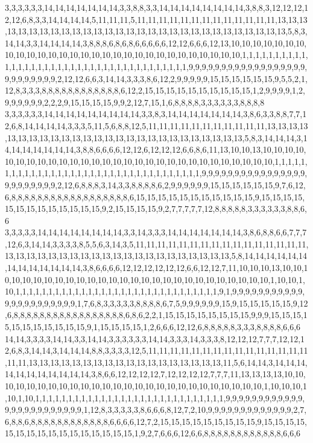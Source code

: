 3,3,3,3,3,3,14,14,14,14,14,14,14,3,3,8,8,3,3,14,14,14,14,14,14,14,14,3,8,8,3,12,12,12,12,12,6,8,3,3,14,14,14,14,5,11,11,11,5,11,11,11,11,11,11,11,11,11,11,11,11,11,13,13,13,13,13,13,13,13,13,13,13,13,13,13,13,13,13,13,13,13,13,13,13,13,13,13,13,13,13,5,8,3,14,14,3,3,14,14,14,14,3,8,8,8,6,8,6,8,6,6,6,6,6,12,12,6,6,6,12,13,10,10,10,10,10,10,10,10,10,10,10,10,10,10,10,10,10,10,10,10,10,10,10,10,10,10,10,10,10,1,1,1,1,1,1,1,1,1,1,1,1,1,1,1,1,1,1,1,1,1,1,1,1,1,1,1,1,1,1,1,1,1,1,1,1,1,1,9,9,9,9,9,9,9,9,9,9,9,9,9,9,9,9,9,9,9,9,9,9,9,9,9,9,2,12,12,6,6,3,14,14,3,3,3,8,6,12,2,9,9,9,9,9,15,15,15,15,15,15,9,5,5,2,1,12,8,3,3,3,8,8,8,8,8,8,8,8,8,8,8,8,6,12,2,15,15,15,15,15,15,15,15,15,15,1,2,9,9,9,9,1,2,9,9,9,9,9,9,2,2,2,9,15,15,15,15,9,9,2,12,7,15,1,6,8,8,8,8,3,3,3,3,3,3,8,8,8,8
3,3,3,3,3,3,14,14,14,14,14,14,14,14,14,3,3,8,3,14,14,14,14,14,14,14,3,8,6,3,3,8,8,7,7,12,6,8,14,14,14,14,3,3,3,5,11,5,6,8,8,12,5,11,11,11,11,11,11,11,11,11,11,11,13,13,13,13,13,13,13,13,13,13,13,13,13,13,13,13,13,13,13,13,13,13,13,13,13,13,5,8,3,14,14,14,3,14,14,14,14,14,14,14,3,8,8,6,6,6,6,12,12,6,12,12,12,6,6,8,6,11,13,10,10,13,10,10,10,10,10,10,10,10,10,10,10,10,10,10,10,10,10,10,10,10,10,10,10,10,10,10,10,10,10,1,1,1,1,1,1,1,1,1,1,1,1,1,1,1,1,1,1,1,1,1,1,1,1,1,1,1,1,1,1,1,1,1,1,1,9,9,9,9,9,9,9,9,9,9,9,9,9,9,9,9,9,9,9,9,9,9,9,9,2,12,6,8,8,8,3,14,3,3,8,8,8,8,6,2,9,9,9,9,9,9,15,15,15,15,15,15,9,7,6,12,6,8,8,8,8,8,8,8,8,8,8,8,8,8,8,8,8,8,8,6,15,15,15,15,15,15,15,15,15,15,15,9,15,15,15,15,15,15,15,15,15,15,15,15,15,9,2,15,15,15,15,9,2,7,7,7,7,7,12,8,8,8,8,8,3,3,3,3,3,3,8,8,6,6
3,3,3,3,3,14,14,14,14,14,14,14,14,3,3,14,3,3,3,14,14,14,14,14,14,14,3,8,6,8,8,6,6,7,7,7,12,6,3,14,14,3,3,3,3,8,5,5,6,3,14,3,5,11,11,11,11,11,11,11,11,11,11,11,11,11,11,11,11,13,13,13,13,13,13,13,13,13,13,13,13,13,13,13,13,13,13,13,13,13,5,8,14,14,14,14,14,14,14,14,14,14,14,14,14,3,8,6,6,6,6,12,12,12,12,12,12,6,6,12,12,7,11,10,10,10,13,10,10,10,10,10,10,10,10,10,10,10,10,10,10,10,10,10,10,10,10,10,10,10,10,10,10,10,1,10,10,1,10,1,1,1,1,1,1,1,1,1,1,1,1,1,1,1,1,1,1,1,1,1,1,1,1,1,1,1,1,1,1,1,9,1,9,9,9,9,9,9,9,9,9,9,9,9,9,9,9,9,9,9,9,9,9,9,1,7,6,8,3,3,3,3,3,8,8,8,8,6,7,5,9,9,9,9,9,9,15,9,15,15,15,15,15,9,12,6,8,8,8,8,8,8,8,8,8,8,8,8,8,8,8,8,8,6,8,6,2,2,1,15,15,15,15,15,15,15,15,9,9,9,15,15,15,15,15,15,15,15,15,15,15,9,1,15,15,15,15,1,2,6,6,6,12,12,6,8,8,8,8,8,3,3,3,8,8,8,8,6,6,6
14,14,3,3,3,3,14,14,3,3,14,14,3,3,3,3,3,3,14,14,3,3,3,14,3,3,3,8,12,12,12,7,7,7,12,12,12,6,8,3,14,14,3,14,14,14,8,8,3,3,3,3,12,5,11,11,11,11,11,11,11,11,11,11,11,11,11,11,11,11,11,13,13,13,13,13,13,13,13,13,13,13,13,13,13,13,13,13,13,11,5,6,14,14,3,14,14,14,14,14,14,14,14,14,14,14,3,8,6,6,12,12,12,12,7,12,12,12,12,7,7,7,11,13,13,13,13,10,10,10,10,10,10,10,10,10,10,10,10,10,10,10,10,10,10,10,10,10,10,10,10,10,10,1,10,10,10,1,10,1,10,1,1,1,1,1,1,1,1,1,1,1,1,1,1,1,1,1,1,1,1,1,1,1,1,1,1,1,1,1,9,9,9,9,9,9,9,9,9,9,9,9,9,9,9,9,9,9,9,9,9,9,9,9,1,12,8,3,3,3,3,3,8,6,6,6,8,12,7,2,10,9,9,9,9,9,9,9,9,9,9,9,9,9,2,7,6,8,8,6,8,8,8,8,8,8,8,8,8,8,8,8,6,6,6,6,12,7,2,15,15,15,15,15,15,15,15,15,9,15,15,15,15,15,15,15,15,15,15,15,15,15,15,15,15,1,9,2,7,6,6,6,12,6,6,8,8,8,8,8,8,8,8,8,8,8,8,6,6,6
